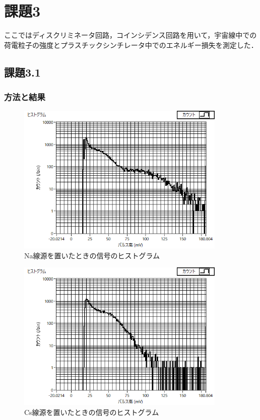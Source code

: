 \documentclass[a4paper,11pt]{jsarticle}
\begin{document}
\section{課題3}
ここではディスクリミネータ回路，コインシデンス回路を用いて，宇宙線中での荷電粒子の強度とプラスチックシンチレータ中でのエネルギー損失を測定した．

\subsection{課題3.1}
\subsubsection{方法と結果}
\begin{figure}[htbp]
  \centering
  \includegraphics[width=10cm]{na_aself.png}
  \caption{Na線源を置いたときの信号のヒストグラム}
  \label{fig:na_aself}
\end{figure}

\begin{figure}[htbp]
  \centering
  \includegraphics[width=10cm]{cs_aself.png}
  \caption{Cs線源を置いたときの信号のヒストグラム}
  \label{fig:cs_aself}
\end{figure}
\end{document}
